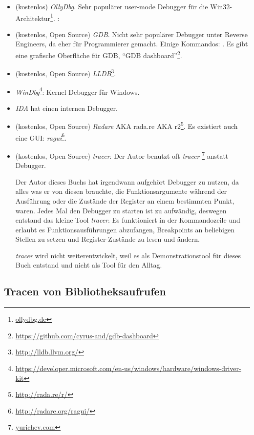 \begin{itemize}
\item (kostenlos) \emph{OllyDbg}.
Sehr populärer user-mode Debugger für die Win32-Architektur\footnote{\href{http://go.yurichev.com/17032}{ollydbg.de}}.
\ShortHotKeyCheatsheet: 

\item (kostenlos, Open Source) \emph{GDB}.
Nicht sehr populärer Debugger unter Reverse Engineers, da eher für Programmierer gemacht.
Einige Kommandos: .
Es gibt eine grafische Oberfläche für GDB, ``GDB dashboard''\footnote{\url{https://github.com/cyrus-and/gdb-dashboard}}.

\item (kostenlos, Open Source) \emph{LLDB}\footnote{\url{http://lldb.llvm.org/}}.

\item \emph{WinDbg}\footnote{\url{https://developer.microsoft.com/en-us/windows/hardware/windows-driver-kit}}:
Kernel-Debugger für Windows.

\item \emph{IDA} hat einen internen Debugger.

\item (kostenlos, Open Source) \emph{Radare} \ac{AKA} rada.re \ac{AKA} r2\footnote{\url{http://rada.re/r/}}.
Es existiert auch eine GUI: \emph{ragui}\footnote{\url{http://radare.org/ragui/}}.

\item (kostenlos, Open Source) \emph{tracer}.
\label{tracer}
Der Autor benutzt oft \emph{tracer}
\footnote{\href{http://go.yurichev.com/17338}{yurichev.com}}
anstatt Debugger.

Der Autor dieses Buchs hat irgendwann aufgehört Debugger zu nutzen, da alles was er von diesen
brauchte, die Funktionsargumente während der Ausführung oder die Zustände der Register an einem
bestimmten Punkt, waren.
Jedes Mal den Debugger zu starten ist zu aufwändig, deswegen entstand das kleine Tool \emph{tracer}.
Es funktioniert in der Kommandozeile und erlaubt es Funktionsausführungen abzufangen,
Breakpoints an beliebigen Stellen zu setzen und Register-Zustände zu lesen und ändern.

\emph{tracer} wird nicht weiterentwickelt, weil es als Demonstrationstool für dieses Buch entstand
und nicht als Tool für den Alltag.
\end{itemize}

\subsection{Tracen von Bibliotheksaufrufen}

